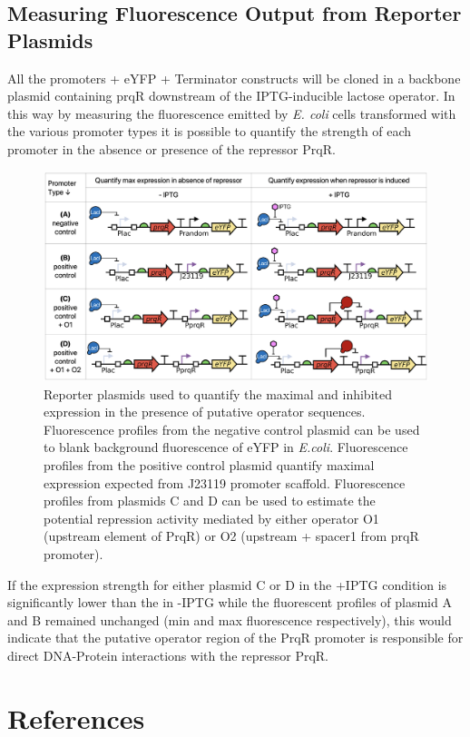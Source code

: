 \subsection*{Measuring Fluorescence Output from Reporter Plasmids}
All the promoters + eYFP + Terminator constructs will be cloned in a backbone plasmid containing prqR downstream of the IPTG-inducible lactose operator. In this way by measuring the fluorescence emitted by \textit{E. coli} cells transformed with the various promoter types it is possible to quantify the strength of each promoter in the absence  or presence of the repressor PrqR.
\begin{figure}[H]
    \centering
    \includegraphics[width=\textwidth]{images/operator_plasmids.png}
    \caption{Reporter plasmids used to quantify the maximal and inhibited expression in the presence of putative operator sequences. Fluorescence profiles from the negative control plasmid can be used to blank background fluorescence of eYFP in \textit{E.coli}. Fluorescence profiles from the positive control plasmid quantify maximal expression expected from J23119 promoter scaffold. Fluorescence profiles from plasmids C and D can be used to estimate the potential repression activity mediated by either operator O1 (upstream element of PrqR) or O2 (upstream + spacer1 from prqR promoter).}
    \label{fig:plasmids}
\end{figure}
If the expression strength for either plasmid C or D in the +IPTG condition is significantly lower than the in -IPTG while the fluorescent profiles of plasmid A and B remained unchanged (min and max fluorescence respectively), this would indicate that the putative operator region of the PrqR promoter is responsible for direct DNA-Protein interactions with the repressor PrqR.

\section*{References}


